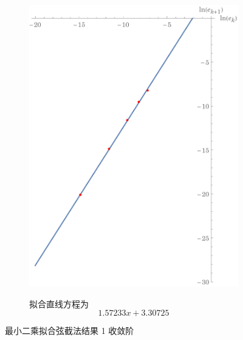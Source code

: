 \documentclass[11pt]{article}
\begin{document}
\begin{figure}[h]
\begin{subfigure}{.49\textwidth}
        \includegraphics[scale = 0.45]{Figure/收敛阶-Secant1.pdf}
        \label{figure:Secant-LS1}
    \end{subfigure}
    \begin{subfigure}{.49\textwidth}
        \centering
        拟合直线方程为
        \begin{equation*}
            1.57233 x+3.30725
        \end{equation*}
    \end{subfigure}
    \caption{最小二乘拟合弦截法结果 1 收敛阶}
    \label{Secant-LS1}
\end{figure}
\end{document}

